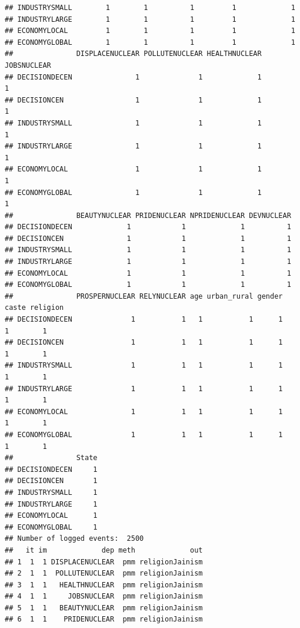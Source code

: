 \documentclass[
]{article}
\begin{document}
\begin{verbatim}
## INDUSTRYSMALL        1        1          1         1             1
## INDUSTRYLARGE        1        1          1         1             1
## ECONOMYLOCAL         1        1          1         1             1
## ECONOMYGLOBAL        1        1          1         1             1
##               DISPLACENUCLEAR POLLUTENUCLEAR HEALTHNUCLEAR JOBSNUCLEAR
## DECISIONDECEN               1              1             1           1
## DECISIONCEN                 1              1             1           1
## INDUSTRYSMALL               1              1             1           1
## INDUSTRYLARGE               1              1             1           1
## ECONOMYLOCAL                1              1             1           1
## ECONOMYGLOBAL               1              1             1           1
##               BEAUTYNUCLEAR PRIDENUCLEAR NPRIDENUCLEAR DEVNUCLEAR
## DECISIONDECEN             1            1             1          1
## DECISIONCEN               1            1             1          1
## INDUSTRYSMALL             1            1             1          1
## INDUSTRYLARGE             1            1             1          1
## ECONOMYLOCAL              1            1             1          1
## ECONOMYGLOBAL             1            1             1          1
##               PROSPERNUCLEAR RELYNUCLEAR age urban_rural gender caste religion
## DECISIONDECEN              1           1   1           1      1     1        1
## DECISIONCEN                1           1   1           1      1     1        1
## INDUSTRYSMALL              1           1   1           1      1     1        1
## INDUSTRYLARGE              1           1   1           1      1     1        1
## ECONOMYLOCAL               1           1   1           1      1     1        1
## ECONOMYGLOBAL              1           1   1           1      1     1        1
##               State
## DECISIONDECEN     1
## DECISIONCEN       1
## INDUSTRYSMALL     1
## INDUSTRYLARGE     1
## ECONOMYLOCAL      1
## ECONOMYGLOBAL     1
## Number of logged events:  2500 
##   it im             dep meth             out
## 1  1  1 DISPLACENUCLEAR  pmm religionJainism
## 2  1  1  POLLUTENUCLEAR  pmm religionJainism
## 3  1  1   HEALTHNUCLEAR  pmm religionJainism
## 4  1  1     JOBSNUCLEAR  pmm religionJainism
## 5  1  1   BEAUTYNUCLEAR  pmm religionJainism
## 6  1  1    PRIDENUCLEAR  pmm religionJainism
\end{verbatim}
\end{document}
